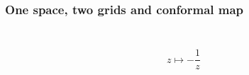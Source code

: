 \documentclass[aspectratio=169]{beamer}
\begin{document}
\begin{frame}
    \frametitle{One space, two grids and conformal map}
    \begin{columns}
        \begin{column}{0.5\textwidth}
            \begin{figure}[ht]\centering
            \end{figure}
        \end{column}
        \begin{column}{0.5\textwidth}
            \begin{figure}[ht]\centering
            \end{figure}
        \end{column}
    \end{columns}
    \begin{center}
        \[
            z \mapsto - \frac{1}{z}
        \]
    \end{center}
\end{frame}
\end{document}
